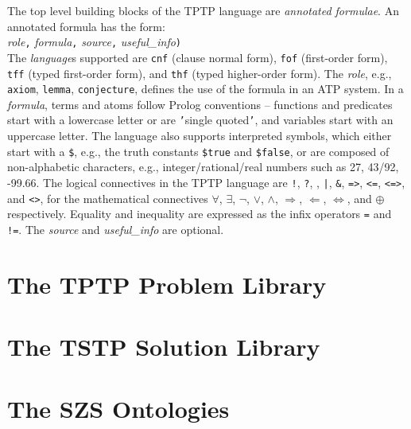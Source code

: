 \documentclass{easychair}
\newcommand{\smalltt}[1]{\small \texttt{#1}}
\begin{document}
The top level building blocks of the TPTP language are {\em annotated formulae}.
An annotated formula has the form:\\
{\em role}{\tt ,}
{\em formula}{\tt ,}
{\em source}{\tt ,}
{\em useful\_info}{\tt )}\\
The {\em language}s supported are {\smalltt{cnf}} (clause normal form), {\smalltt{fof}}
(first-order form), {\smalltt{tff}} (typed first-order form), and {\smalltt{thf}}
(typed higher-order form).
The {\em role}, e.g., {\smalltt{axiom}}, {\smalltt{lemma}}, {\smalltt{conjecture}},
defines the use of the formula in an ATP system.
In a {\em formula}, terms and atoms follow Prolog conventions
-- functions and predicates start with a lowercase letter or are {\tt '}single quoted{\tt '}, and 
variables start with an uppercase letter.
The language also supports interpreted symbols, which either start with a {\tt \$}, e.g., 
the truth constants {\smalltt{\$true}} and {\smalltt{\$false}}, or are composed of 
non-alphabetic characters, e.g., integer/rational/real numbers such as 27, 43/92, -99.66.
The logical connectives in the TPTP language are
{\tt !}, {\tt ?}, {\tt {\raisebox{0.4ex}{\texttildelow}}}, {\tt |}, {\tt \&}, {\tt =>}, {\tt <=},
{\tt <=>}, and {\tt <{\raisebox{0.4ex}{\texttildelow}}>},
for the mathematical connectives
$\forall$, $\exists$, $\neg$, $\vee$, $\wedge$, $\Rightarrow$, $\Leftarrow$, $\Leftrightarrow$, 
and $\oplus$ respectively.
Equality and inequality are expressed as the infix operators {\tt =} and {\tt !=}.
The {\em source} and {\em useful\_info} are optional.

\section{The TPTP Problem Library}
\label{TPTP}

\section{The TSTP Solution Library}
\label{TSTP}

\section{The SZS Ontologies}
\label{SZS}
\end{document}
